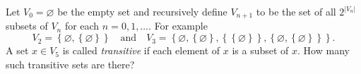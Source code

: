 Let $V_0 = \varnothing$ be the empty set and recursively define $V_{n+1}$ to be the set of all $2^{|V_n|}$ subsets of $V_n$ for each $n=0,1,\dots$. For example \[
	V_2 = \left\{ \varnothing, \left\{ \varnothing \right\} \right\}
	\quad\text{and}\quad
	V_3 
	=
	\left\{ 
	  \varnothing,
	  \left\{ \varnothing \right\},
	  \left\{ \left\{ \varnothing \right\} \right\},
	  \left\{ \varnothing, \left\{ \varnothing \right\} \right\}
	\right\}.
\] A set $x \in V_5$ is called \emph{transitive} if each element of $x$ is a subset of $x$. How many such transitive sets are there?
